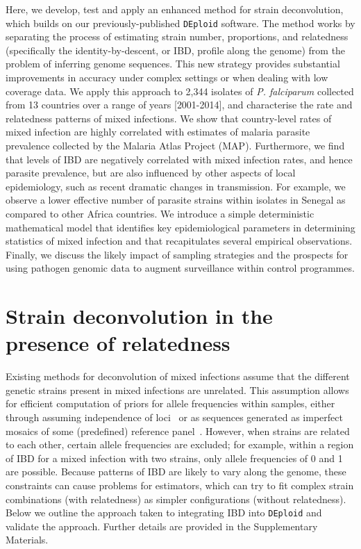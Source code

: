 \documentclass[9pt,lineno]{elife}
\begin{document}
Here, we develop, test and apply an enhanced method for strain deconvolution, which builds on our previously-published \texttt{DEploid} software.  The method works by separating the process of estimating strain number, proportions, and relatedness (specifically the identity-by-descent, or IBD, profile along the genome) from the problem of inferring genome sequences. This new strategy provides substantial improvements in accuracy under complex settings or when dealing with low coverage data.  We apply this approach to 2,344 isolates of {\it P. falciparum} collected from 13 countries over a range of years [2001-2014], and characterise the rate and relatedness patterns of mixed infections.  We show that country-level rates of mixed infection are highly correlated with estimates of malaria parasite prevalence collected by the Malaria Atlas Project (MAP). Furthermore, we find that levels of IBD are negatively correlated with mixed infection rates, and hence parasite prevalence, but are also influenced by other aspects of local epidemiology, such as recent dramatic changes in transmission. For example, we observe a lower effective number of parasite strains within isolates in Senegal as compared to other Africa countries.  We introduce a simple deterministic mathematical model that identifies key epidemiological parameters in determining statistics of mixed infection and that recapitulates several empirical observations.  Finally, we discuss the likely impact of sampling strategies and the prospects for using pathogen genomic data to augment surveillance within control programmes.



\section{Strain deconvolution in the presence of relatedness}

Existing methods for deconvolution of mixed infections assume that the different genetic strains present in mixed infections are unrelated.  This assumption allows for efficient computation of priors for allele frequencies within samples, either through assuming independence of loci~\citep{Jack2016} or as sequences generated as imperfect mosaics of some (predefined) reference panel~\citep{Zhu2017}.  However, when strains are related to each other, certain allele frequencies are excluded; for example, within a region of IBD for a mixed infection with two strains, only allele frequencies of 0 and 1 are possible.  Because patterns of IBD are likely to vary along the genome, these constraints can cause problems for estimators, which can try to fit complex strain combinations (with relatedness) as simpler configurations (without relatedness).  Below we outline the approach taken to integrating IBD into \texttt{DEploid} and validate the approach.  Further details are provided in the Supplementary Materials.
\end{document}
